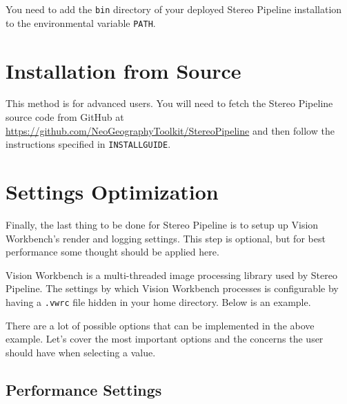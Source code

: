 You need to add the \texttt{bin} directory of your deployed Stereo
Pipeline installation to the environmental variable \texttt{PATH}.

\section{\label{sec:Source-Installation}Installation from Source}

This method is for advanced users. You will need to fetch the Stereo Pipeline source code from GitHub at
\url{https://github.com/NeoGeographyToolkit/StereoPipeline} and then
follow the instructions specified in \texttt{INSTALLGUIDE}.

\section{\label{sec:Settings}Settings Optimization}

Finally, the last thing to be done for Stereo Pipeline is to setup up
Vision Workbench's render and logging settings. This step is optional,
but for best performance some thought should be applied here.

Vision Workbench is a multi-threaded image processing library used by
Stereo Pipeline. The settings by which Vision Workbench processes is
configurable by having a \texttt{.vwrc} file hidden in your home
directory. Below is an example.

\newpage
\begin{minipage}{0.94\linewidth}
\small{}
\end{minipage}

There are a lot of possible options that can be implemented in the
above example. Let's cover the most important options and the concerns
the user should have when selecting a value.

\subsection{Performance Settings}

